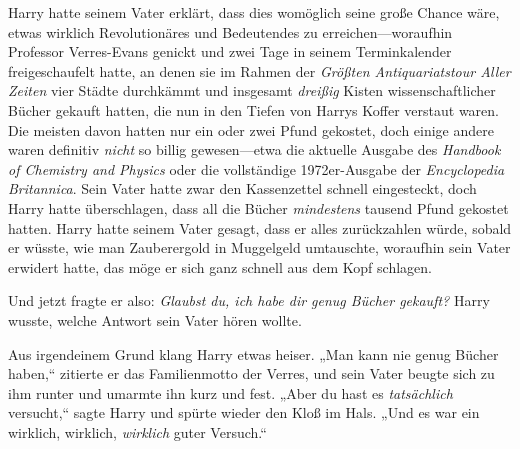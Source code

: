 Harry hatte seinem Vater erklärt, dass dies womöglich seine große Chance wäre, etwas wirklich Revolutionäres und Bedeutendes zu erreichen—woraufhin Professor Verres-Evans genickt und zwei Tage in seinem Terminkalender freigeschaufelt hatte, an denen sie im Rahmen der \emph{Größten Antiquariatstour Aller Zeiten} vier Städte durchkämmt und insgesamt \emph{dreißig} Kisten wissenschaftlicher Bücher gekauft hatten, die nun in den Tiefen von Harrys Koffer verstaut waren. Die meisten davon hatten nur ein oder zwei Pfund gekostet, doch einige andere waren definitiv \emph{nicht} so billig gewesen—etwa die aktuelle Ausgabe des \emph{Handbook of Chemistry and Physics} oder die vollständige 1972er-Ausgabe der \emph{Encyclopedia Britannica}. Sein Vater hatte zwar den Kassenzettel schnell eingesteckt, doch Harry hatte überschlagen, dass all die Bücher \emph{mindestens} tausend Pfund gekostet hatten. Harry hatte seinem Vater gesagt, dass er alles zurückzahlen würde, sobald er wüsste, wie man Zauberergold in Muggelgeld umtauschte, woraufhin sein Vater erwidert hatte, das möge er sich ganz schnell aus dem Kopf schlagen.

Und jetzt fragte er also: \emph{Glaubst du, ich habe dir genug Bücher gekauft?} Harry wusste, welche Antwort sein Vater hören wollte.

Aus irgendeinem Grund klang Harry etwas heiser. „Man kann nie genug Bücher haben,“ zitierte er das Familienmotto der Verres, und sein Vater beugte sich zu ihm runter und umarmte ihn kurz und fest. „Aber du hast es \emph{tatsächlich} versucht,“ sagte Harry und spürte wieder den Kloß im Hals. „Und es war ein wirklich, wirklich, \emph{wirklich} guter Versuch.“

